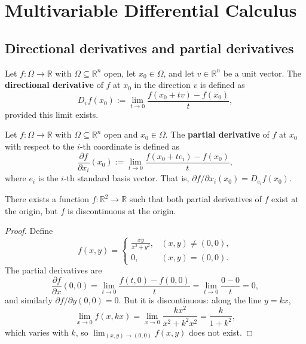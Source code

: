 \section{Multivariable Differential Calculus}

\subsection{Directional derivatives and partial derivatives}

\begin{definition}\label{def:directional_derivative}
Let $f: \Omega \to \mathbb{R}$ with $\Omega \subseteq \mathbb{R}^n$ open, let $x_0 \in \Omega$, and let $v \in \mathbb{R}^n$ be a unit vector. The \textbf{directional derivative} of $f$ at $x_0$ in the direction $v$ is defined as
\[
D_v f(x_0) := \lim_{t \to 0} \frac{f(x_0 + t v) - f(x_0)}{t},
\]
provided this limit exists.
\end{definition}

\begin{definition}\label{def:partial_derivative_ra}
Let $f: \Omega \to \mathbb{R}$ with $\Omega \subseteq \mathbb{R}^n$ open and $x_0 \in \Omega$. The \textbf{partial derivative} of $f$ at $x_0$ with respect to the $i$-th coordinate is defined as
\[
\frac{\partial f}{\partial x_i}(x_0) := \lim_{t \to 0} \frac{f(x_0 + t e_i) - f(x_0)}{t},
\]
where $e_i$ is the $i$-th standard basis vector. That is, $\partial f/\partial x_i(x_0) = D_{e_i} f(x_0)$.
\end{definition}

\begin{proposition}\label{prop:partial_not_continuous}
There exists a function $f: \mathbb{R}^2 \to \mathbb{R}$ such that both partial derivatives of $f$ exist at the origin, but $f$ is discontinuous at the origin.
\end{proposition}

\begin{proof}
Define
\[
f(x, y) = \begin{cases} \frac{xy}{x^2 + y^2}, & (x, y) \neq (0, 0), \\ 0, & (x, y) = (0, 0). \end{cases}
\]
The partial derivatives are
\[
\frac{\partial f}{\partial x}(0, 0) = \lim_{t \to 0} \frac{f(t, 0) - f(0, 0)}{t} = \lim_{t \to 0} \frac{0 - 0}{t} = 0,
\]
and similarly $\partial f/\partial y(0, 0) = 0$. But it is discontinuous: along the line $y = kx$,
\[
\lim_{x \to 0} f(x, kx) = \lim_{x \to 0} \frac{k x^2}{x^2 + k^2 x^2} = \frac{k}{1 + k^2},
\]
which varies with $k$, so $\lim_{(x, y) \to (0, 0)} f(x, y)$ does not exist.
\end{proof}


